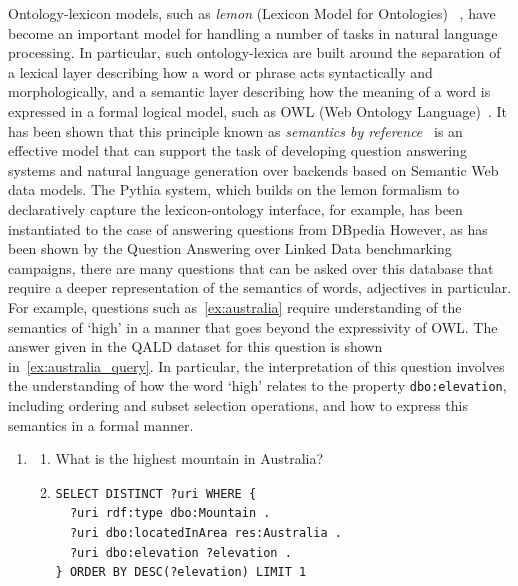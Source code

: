 \documentclass[11pt]{article}
\begin{document}
Ontology-lexicon models, such as \emph{lemon} (Lexicon Model for Ontologies)~
\cite{mccrae2012inter}, have become an important model for handling a 
number of tasks in natural language processing. In particular, such 
ontology-lexica are built around the separation of a lexical layer describing 
how a word or phrase acts syntactically and morphologically, and a semantic layer 
describing how the meaning of a word is expressed in a formal logical model, 
such as OWL (Web Ontology Language)~\cite{mcguinness2004owl}. It has been 
shown that this principle known as \emph{semantics by reference}~
\cite{buitelaar2010ontology} is an effective model that can support the task of developing
question answering systems \cite{unger2011pythia} and natural language 
generation \cite{cimiano2013exploiting} over backends based on Semantic Web data models.
The Pythia system, which builds on the lemon formalism to declaratively capture the lexicon-ontology interface, for example, has been instantiated to the case of answering questions from DBpedia \cite{unger2011pythia}
However, as has been 
shown by the Question Answering over Linked Data \cite[QALD]{lopez2013evaluating}
benchmarking campaigns, there are many questions that can be asked over this database that require 
a deeper representation of the semantics of words, adjectives in particular. For example, 
questions such as~\ref{ex:australia} require understanding of the semantics of `high' in a manner that goes beyond the expressivity of OWL. The answer given 
in the QALD dataset for this question is shown in~\ref{ex:australia_query}. 
In particular, the interpretation of this question involves the understanding of 
how the word `high' relates to the property {\tt dbo:elevation}, including ordering 
and subset selection operations, and how to express this semantics in a formal manner.

\begin{enumerate}
\item \begin{enumerate} 
\item What is the highest mountain in Australia? \label{ex:australia}
\item \begin{verbatim}
SELECT DISTINCT ?uri WHERE { 
  ?uri rdf:type dbo:Mountain . 
  ?uri dbo:locatedInArea res:Australia . 
  ?uri dbo:elevation ?elevation . 
} ORDER BY DESC(?elevation) LIMIT 1
\end{verbatim} 
\label{ex:australia_query}
\end{enumerate}
\end{enumerate}
\end{document}

